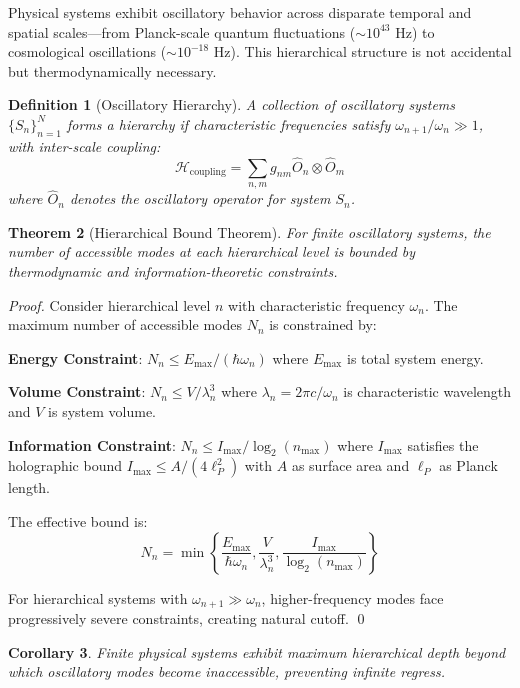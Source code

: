 \documentclass[11pt]{article}
\newtheorem{theorem}{Theorem}[section]
\newtheorem{corollary}[theorem]{Corollary}
\newtheorem{definition}[theorem]{Definition}
\theoremstyle{remark}
\begin{document}
Physical systems exhibit oscillatory behavior across disparate temporal and spatial scales—from Planck-scale quantum fluctuations ($\sim 10^{43}$ Hz) to cosmological oscillations ($\sim 10^{-18}$ Hz). This hierarchical structure is not accidental but thermodynamically necessary.

\begin{definition}[Oscillatory Hierarchy]
A collection of oscillatory systems $\{S_n\}_{n=1}^{N}$ forms a hierarchy if characteristic frequencies satisfy $\omega_{n+1}/\omega_n \gg 1$, with inter-scale coupling:
$$\mathcal{H}_{\text{coupling}} = \sum_{n,m} g_{nm} \hat{O}_n \otimes \hat{O}_m$$
where $\hat{O}_n$ denotes the oscillatory operator for system $S_n$.
\end{definition}

\begin{theorem}[Hierarchical Bound Theorem]
For finite oscillatory systems, the number of accessible modes at each hierarchical level is bounded by thermodynamic and information-theoretic constraints.
\end{theorem}

\begin{proof}
Consider hierarchical level $n$ with characteristic frequency $\omega_n$. The maximum number of accessible modes $N_n$ is constrained by:

\textbf{Energy Constraint}: $N_n \leq E_{\text{max}}/(\hbar\omega_n)$ where $E_{\text{max}}$ is total system energy.

\textbf{Volume Constraint}: $N_n \leq V/\lambda_n^3$ where $\lambda_n = 2\pi c/\omega_n$ is characteristic wavelength and $V$ is system volume.

\textbf{Information Constraint}: $N_n \leq I_{\text{max}}/\log_2(n_{\text{max}})$ where $I_{\text{max}}$ satisfies the holographic bound $I_{\text{max}} \leq A/(4\ell_P^2)$ with $A$ as surface area and $\ell_P$ as Planck length.

The effective bound is:
$$N_n = \min\left\{\frac{E_{\text{max}}}{\hbar\omega_n}, \frac{V}{\lambda_n^3}, \frac{I_{\text{max}}}{\log_2(n_{\text{max}})}\right\}$$

For hierarchical systems with $\omega_{n+1} \gg \omega_n$, higher-frequency modes face progressively severe constraints, creating natural cutoff. \qed
\end{proof}

\begin{corollary}
Finite physical systems exhibit maximum hierarchical depth beyond which oscillatory modes become inaccessible, preventing infinite regress.
\end{corollary}
\end{document}
